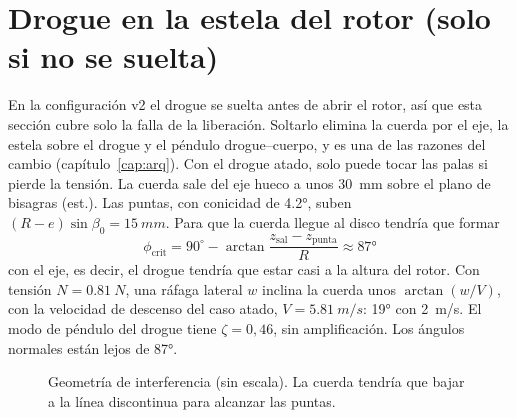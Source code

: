 \section{Drogue en la estela del rotor (solo si no se suelta)}\label{sec:estabilidad-drogue}

En la configuración v2 el drogue se suelta antes de abrir el rotor, así que esta sección
cubre solo la falla de la liberación. Soltarlo elimina la cuerda por el eje, la estela sobre
el drogue y el péndulo drogue--cuerpo, y es una de las razones del cambio
(capítulo~\ref{cap:arq}). Con el drogue atado, solo puede tocar las palas si pierde la
tensión. La cuerda sale del eje hueco a unos \SI{30}{mm} sobre el plano de bisagras (est.).
Las puntas, con conicidad de \ang{4.2}, suben $(R-e)\sin\beta_0=\SI{15}{mm}$. Para que la
cuerda llegue al disco tendría que formar
\begin{equation}
  \phi_\text{crit}=90^\circ-\arctan\frac{z_\text{sal}-z_\text{punta}}{R}\approx\ang{87}
\end{equation}
con el eje, es decir, el drogue tendría que estar casi a la altura del rotor. Con tensión
$N=\SI{0.81}{N}$, una ráfaga lateral $w$ inclina la cuerda unos $\arctan(w/V)$, con la velocidad de
descenso del caso atado, $V=\SI{5.81}{m/s}$: \ang{19} con \SI{2}{m/s}. El modo de péndulo del drogue tiene $\zeta=0{,}46$, sin
amplificación. Los ángulos normales están lejos de \ang{87}.

\begin{figure}[H]
\centering
{}
\caption{Geometría de interferencia (sin escala). La cuerda tendría que bajar a la línea
discontinua para alcanzar las puntas.}
\label{fig:estabilidad-drogue}
\end{figure}

